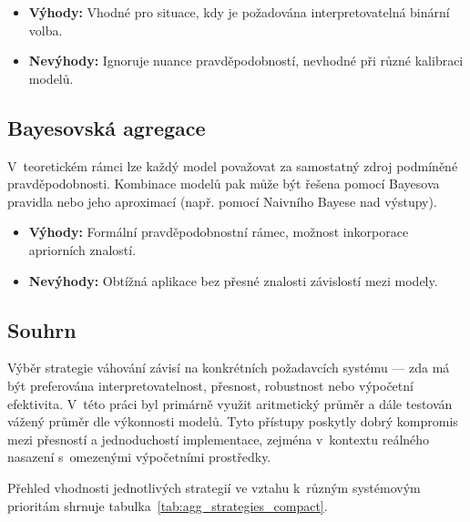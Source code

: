 \begin{itemize}
    \item \textbf{Výhody:} Vhodné pro situace, kdy je požadována interpretovatelná binární volba.
    \item \textbf{Nevýhody:} Ignoruje nuance pravděpodobností, nevhodné při různé kalibraci modelů.
\end{itemize}

\subsection{Bayesovská agregace}

V~teoretickém rámci lze každý model považovat za samostatný zdroj podmíněné pravděpodobnosti. Kombinace modelů pak může být řešena pomocí Bayesova pravidla nebo jeho aproximací (např. pomocí Naivního Bayese nad výstupy). \cite{bai2015bayesian}

\begin{itemize}
    \item \textbf{Výhody:} Formální pravděpodobnostní rámec, možnost inkorporace apriorních znalostí.
    \item \textbf{Nevýhody:} Obtížná aplikace bez přesné znalosti závislostí mezi modely.
\end{itemize}





\subsection{Souhrn}

Výběr strategie váhování závisí na konkrétních požadavcích systému — zda má být preferována interpretovatelnost, přesnost, robustnost nebo výpočetní efektivita. V~této práci byl primárně využit aritmetický průměr a dále testován vážený průměr dle výkonnosti modelů. Tyto přístupy poskytly dobrý kompromis mezi přesností a jednoduchostí implementace, zejména v~kontextu reálného nasazení s~omezenými výpočetními prostředky.

Přehled vhodnosti jednotlivých strategií ve vztahu k~různým systémovým prioritám shrnuje tabulka~\ref{tab:agg_strategies_compact}.

